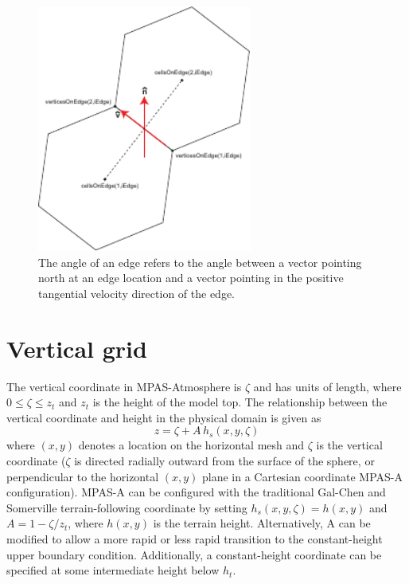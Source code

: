\begin{figure}[htb]
\begin{center}
\includegraphics[height=3.2in]{figures/angleEdge.pdf}
\caption{The angle of an edge refers to the angle between a vector pointing north at an edge location
and a vector pointing in the positive tangential velocity direction of the edge.}
\label{fig:angleEdge}
\end{center}
\end{figure}

\vfill \eject

\section{Vertical grid}

The vertical coordinate in MPAS-Atmosphere is $\zeta$ and has units of length, where $0 \le \zeta \le z_{t}$ and  $z_t$ is the height of the model top.  The relationship between the vertical coordinate and height in the physical domain is given as
%
\begin{equation}
z = \zeta + A\, h_s(x,y,\zeta)
\end{equation}
%
where $(x,y)$ denotes a location on the horizontal mesh and $\zeta$ is the vertical coordinate ($\zeta$ is directed radially outward from the surface of the sphere, or perpendicular to the horizontal $(x,y)$ plane in a Cartesian coordinate MPAS-A configuration).  MPAS-A can be configured with the traditional Gal-Chen and Somerville terrain-following coordinate by setting $h_s(x,y,\zeta) = h(x,y)$ and $A = 1-\zeta/z_t$, where $h(x,y)$ is the terrain height.  Alternatively, A can be modified to allow a more rapid or less rapid transition to the constant-height upper boundary condition.  Additionally, a constant-height coordinate can be specified at some intermediate height below $h_t$.

